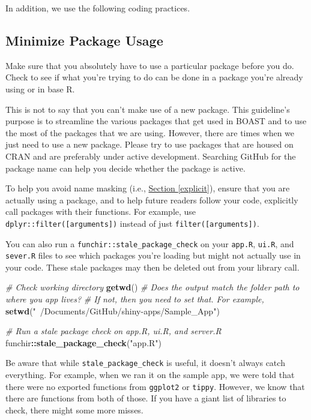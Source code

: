 \documentclass[
]{book}
\newenvironment{Shaded}{\begin{snugshade}}{\end{snugshade}}
\newcommand{\CommentTok}[1]{\textcolor[rgb]{0.56,0.35,0.01}{\textit{#1}}}
\newcommand{\KeywordTok}[1]{\textcolor[rgb]{0.13,0.29,0.53}{\textbf{#1}}}
\newcommand{\NormalTok}[1]{#1}
\newcommand{\OperatorTok}[1]{\textcolor[rgb]{0.81,0.36,0.00}{\textbf{#1}}}
\newcommand{\StringTok}[1]{\textcolor[rgb]{0.31,0.60,0.02}{#1}}
\begin{document}
In addition, we use the following coding practices.

\hypertarget{minPackages}{%
\subsection{Minimize Package Usage}\label{minPackages}}

Make sure that you absolutely have to use a particular package before you do. Check to see if what you're trying to do can be done in a package you're already using or in base R.

This is not to say that you can't make use of a new package. This guideline's purpose is to streamline the various packages that get used in BOAST and to use the most of the packages that we are using. However, there are times when we just need to use a new package. Please try to use packages that are housed on CRAN and are preferably under active development. Searching GitHub for the package name can help you decide whether the package is active.

To help you avoid name masking (i.e., \protect\hyperlink{explicit}{Section \ref{explicit}}), ensure that you are actually using a package, and to help future readers follow your code, explicitly call packages with their functions. For example, use \texttt{dplyr::filter({[}arguments{]})} instead of just \texttt{filter({[}arguments{]})}.

You can also run a \texttt{funchir::stale\_package\_check} on your \texttt{app.R}, \texttt{ui.R}, and \texttt{sever.R} files to see which packages you're loading but might not actually use in your code. These stale packages may then be deleted out from your library call.

\begin{Shaded}
\begin{Highlighting}[]
\CommentTok{# Check working directory}
\KeywordTok{getwd}\NormalTok{()}
\CommentTok{# Does the output match the folder path to where you app lives?}
\CommentTok{# If not, then you need to set that. For example,}
\KeywordTok{setwd}\NormalTok{(}\StringTok{"~/Documents/GitHub/shiny-apps/Sample_App"}\NormalTok{)}

\CommentTok{# Run a stale package check on app.R, ui.R, and server.R}
\NormalTok{funchir}\OperatorTok{::}\KeywordTok{stale_package_check}\NormalTok{(}\StringTok{"app.R"}\NormalTok{)}
\end{Highlighting}
\end{Shaded}

Be aware that while \texttt{stale\_package\_check} is useful, it doesn't always catch everything. For example, when we ran it on the sample app, we were told that there were no exported functions from \texttt{ggplot2} or \texttt{tippy}. However, we know that there are functions from both of those. If you have a giant list of libraries to check, there might some more misses.
\end{document}
